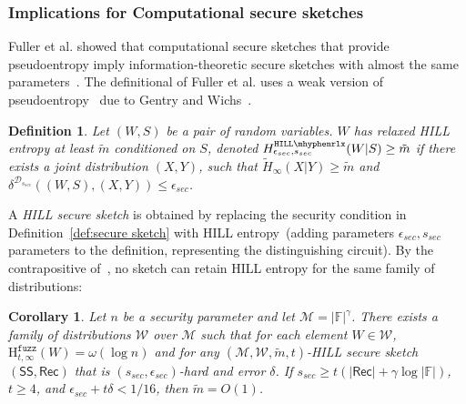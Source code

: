\documentclass[11pt]{article}
\newcommand{\defref}[1]{\mbox{Definition~\ref{#1}}}
\newcommand{\class}[1]{{\ensuremath{\mathsf{#1}}}}
\newcommand{\sketch}{\ensuremath{\class{SS}}\xspace}
\newcommand{\rec}{\ensuremath{\class{Rec}}\xspace}
\newcommand{\hillrlx}{\ensuremath{\mathtt{HILL\mhyphen rlx}}\xspace}
\newcommand{\Hfuzz}{\mathrm{H}^{\mathtt{fuzz}}_{t,\infty}}
\newtheorem{corollary}[theorem]{Corollary}
\newtheorem{definition}[theorem]{Definition}
\begin{document}
\subsubsection{Implications for Computational secure sketches}
\label{sec:feas comp sec sketch}
Fuller et al. showed that computational secure sketches that provide pseudoentropy imply information-theoretic secure sketches with almost the same parameters~\cite[Corollary 3.8]{fuller2013computational}.  %
The definitional of Fuller et al. uses a weak version of pseudoentropy~\cite{DBLP:journals/siamcomp/HastadILL99} due to Gentry and Wichs~\cite{gentry2011separating}.

\begin{definition}
\label{def:relaxed hill}
Let $(W, S)$ be a pair of random variables.  $W$ has 
\emph{relaxed HILL entropy} at least $\tilde{m}$ conditioned on $S$,
denoted $H^{\hillrlx}_{\epsilon_{sec}, s_{sec}}(W|S)\geq \tilde{m}$ if there exists a joint distribution $(X, Y)$, such that $\tilde{H}_\infty(X|Y)\geq \tilde{m}$ and $\delta^{\mathcal{D}_{s_{sec}}} ((W, S),(X,Y))\leq \epsilon_{sec}$.
\end{definition}

A \emph{HILL secure sketch} is obtained by replacing the security condition in \defref{def:secure sketch} with HILL entropy~(adding parameters $\epsilon_{sec}, s_{sec}$ parameters to the definition, representing the distinguishing circuit).  By the contrapositive of~\cite[Corollary 3.8]{fuller2013computational}, no sketch can retain HILL entropy for the same family of distributions:

\begin{corollary}
\label{cor:imposs comp sketch}
Let $n$ be a security parameter and let $\mathcal{M} = |\mathbb{F}|^\gamma$.  There exists a family of distributions $\mathcal{W}$ over $\mathcal{M}$ such that for each element $W\in \mathcal{W}$, $\Hfuzz(W)= \omega(\log n)$ and for any $(\mathcal{M}, \mathcal{W}, \tilde{m}, t)$-HILL secure sketch $(\sketch, \rec)$ that is $(s_{sec}, \epsilon_{sec})$-hard and error $\delta$.  If 
$s_{sec}\ge t(|\rec| + \gamma \log |\mathbb{F}|)$, 
$t\ge 4$, and 
 $\epsilon_{sec} + t\delta < 1/16$,
 then $\tilde{m} =O(1)$.
\end{corollary}


\end{document}

